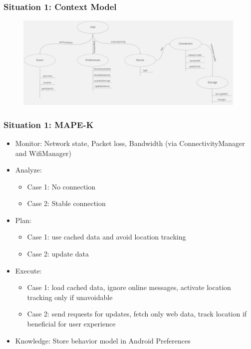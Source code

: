 \documentclass[aspectratio=169]{beamer}
\begin{document}
\begin{frame}
	\frametitle{Situation 1: Context Model}
	 \begin{figure}
		\centering
		\includegraphics[width=0.99\textwidth]{media/contextmodel1.jpg}
	\end{figure}
\end{frame}

\begin{frame}   
	\frametitle{Situation 1: MAPE-K}
	\begin{itemize}
		\item Monitor: Network state, Packet loss, Bandwidth (via ConnectivityManager and WifiManager)
		\item Analyze: 
			 \begin{itemize} 
				\item Case 1: No connection
				\item Case 2: Stable connection
			\end{itemize}
		\item Plan:
			\begin{itemize}
				\item Case 1: use cached data and avoid location tracking
				\item Case 2:  update data
			\end{itemize}
		\item Execute:
			\begin{itemize}
				\item Case 1: load cached data, ignore online messages, activate location tracking only if unavoidable
    				\item Case 2: send requests for updates, fetch only web data, track location if beneficial for user experience 
			\end{itemize}
		\item Knowledge: Store behavior model in Android Preferences
	\end{itemize}
\end{frame}
\end{document}
